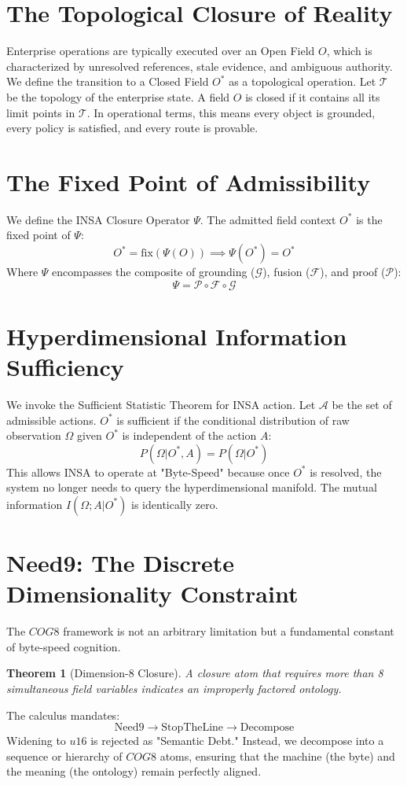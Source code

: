 \documentclass[12pt,a4paper,oneside]{book}
\newtheorem{theorem}{Theorem}[chapter]
\begin{document}
\section{The Topological Closure of Reality}
Enterprise operations are typically executed over an Open Field $O$, which is characterized by unresolved references, stale evidence, and ambiguous authority. We define the transition to a Closed Field $O^*$ as a topological operation. 
Let $\mathcal{T}$ be the topology of the enterprise state. A field $O$ is closed if it contains all its limit points in $\mathcal{T}$. In operational terms, this means every object is grounded, every policy is satisfied, and every route is provable.

\section{The Fixed Point of Admissibility}
We define the INSA Closure Operator $\Psi$. The admitted field context $O^*$ is the fixed point of $\Psi$:
\begin{equation}
O^* = \text{fix}(\Psi(O)) \implies \Psi(O^*) = O^*
\end{equation}
Where $\Psi$ encompasses the composite of grounding ($\mathcal{G}$), fusion ($\mathcal{F}$), and proof ($\mathcal{P}$):
\begin{equation}
\Psi = \mathcal{P} \circ \mathcal{F} \circ \mathcal{G}
\end{equation}

\section{Hyperdimensional Information Sufficiency}
We invoke the Sufficient Statistic Theorem for INSA action. Let $\mathcal{A}$ be the set of admissible actions. $O^*$ is sufficient if the conditional distribution of raw observation $\Omega$ given $O^*$ is independent of the action $A$:
\begin{equation}
P(\Omega | O^*, A) = P(\Omega | O^*)
\end{equation}
This allows INSA to operate at "Byte-Speed" because once $O^*$ is resolved, the system no longer needs to query the hyperdimensional manifold. The mutual information $I(\Omega; A | O^*)$ is identically zero.

\section{Need9: The Discrete Dimensionality Constraint}
The $COG8$ framework is not an arbitrary limitation but a fundamental constant of byte-speed cognition.
\begin{theorem}[Dimension-8 Closure]
A closure atom that requires more than 8 simultaneous field variables indicates an improperly factored ontology.
\end{theorem}
The calculus mandates:
\begin{equation}
\text{Need9} \to \text{StopTheLine} \to \text{Decompose}
\end{equation}
Widening to $u16$ is rejected as "Semantic Debt." Instead, we decompose into a sequence or hierarchy of $COG8$ atoms, ensuring that the machine (the byte) and the meaning (the ontology) remain perfectly aligned.
\end{document}
